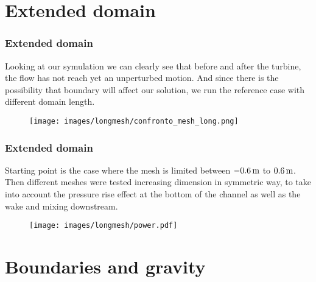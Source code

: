 \documentclass[aspectratio=169]{beamer}
\begin{document}
\section{Extended domain}




\begin{frame}
\frametitle{Extended domain}
Looking at our symulation we can clearly see that before and after the turbine, the flow has not
reach yet an unperturbed motion. 
And since there is the possibility that boundary will affect our
solution, we run the reference case with different domain length.

\begin{figure}[H]
\centering
\texttt{[image: images/longmesh/confronto\_mesh\_long.png]}
\end{figure}

\end{frame}



\begin{frame}
\frametitle{Extended domain}

Starting point is the case where the mesh is limited between $-0.6\,\text{m}$ to  $0.6\,\text{m}$. 
Then different meshes
were tested increasing dimension in symmetric way, to take into account the pressure rise effect
at the bottom of the channel as well as the wake and mixing downstream.
\vspace{-0.75cm}
\begin{figure}[H]
\centering
\quad \quad
\texttt{[image: images/longmesh/power.pdf]}
\end{figure}

\end{frame}


\section{Boundaries and gravity}
\end{document}
